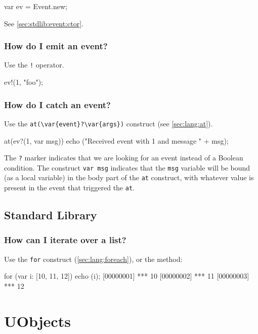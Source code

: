 \begin{urbiunchecked}
var ev = Event.new;
\end{urbiunchecked}

See \autoref{sec:stdlib:event:ctor}.

\subsubsection{How do I emit an event?}
Use the \lstinline|!| operator.

\begin{urbiunchecked}
ev!(1, "foo");
\end{urbiunchecked}

\subsubsection{How do I catch an event?}
Use the \lstinline|at(\var{event}?\var{args})| construct (see
\autoref{sec:lang:at}).

\begin{urbiunchecked}
at(ev?(1, var msg))
  echo ("Received event with 1 and message " + msg);
\end{urbiunchecked}

The \lstinline{?} marker indicates that we are looking for an event instead
of a Boolean condition. The construct \lstinline{var msg} indicates that the
\lstinline{msg} variable will be bound (as a local variable) in the body
part of the \lstinline{at} construct, with whatever value is present in the
event that triggered the \lstinline{at}.

\subsection{Standard Library}

\subsubsection{How can I iterate over a list?}

Use the \lstinline{for} construct (\autoref{sec:lang:foreach}), or the
 method:

\begin{urbiscript}
for (var i: [10, 11, 12]) echo (i);
[00000001] *** 10
[00000002] *** 11
[00000003] *** 12
\end{urbiscript}

\section{UObjects}
